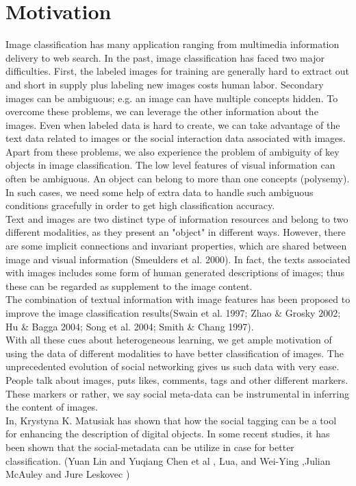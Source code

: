 \section{Motivation}
Image classification has many application ranging from multimedia information delivery to web search. In the past, image classification has faced two major difficulties. First, the labeled images for training are generally hard to extract out and short in supply plus labeling new images costs human labor. Secondary images can be ambiguous; e.g. an image can have multiple concepts hidden. To overcome these problems, we can leverage the other information about the images. Even when labeled data is hard to create, we can take advantage of the text data related to images or the social interaction data associated with images. \cite{heterogenous}\\
\hspace*{1cm} Apart from these problems, we also experience the problem of ambiguity of key objects in image classification. The low level features of visual information can often be ambiguous. An object can belong to more than one concepts (polysemy). In such cases, we need some help of extra data to handle such ambiguous conditions gracefully in order to get high classification accuracy.\\
\hspace*{1cm} Text and images are two distinct type of information resources and belong to two different modalities, as they present an "object" in different ways. However, there are some implicit connections and invariant properties, which are shared between image and visual information (Smeulders et al. 2000). In fact, the texts associated with images includes some form of human generated descriptions of images; thus these can be regarded as supplement to the image content.\\
\hspace*{1cm} The combination of textual information with image features has been proposed to improve the image classification results(Swain et al. 1997; Zhao \& Grosky 2002; Hu \& Bagga 2004; Song et al. 2004; Smith \& Chang 1997). \\
\hspace*{1cm} With all these cues about heterogeneous learning, we get ample motivation of using the data of different modalities to have better classification of images. The unprecedented evolution of social networking gives us such data with very ease. People talk about images, puts likes, comments, tags and other different markers. These markers or rather,  we say social meta-data can be instrumental in inferring the content of images. \\
 In\cite{digiImage}, Krystyna K. Matusiak has shown that how the social tagging can be a tool for enhancing the description of digital objects. In some recent studies, it has been shown that the social-metadata can be utilize in case for better classification. (Yuan Lin and Yuqiang Chen et al \cite{heterogenous}, Lua, and Wei-Ying \cite{liu},Julian McAuley and Jure Leskovec \cite{McAuley} )\\